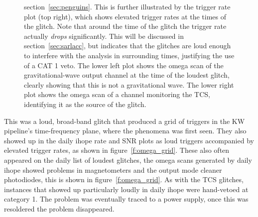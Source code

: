 \begin{figure}
{section~\ref{sec:penguins}.  This is further illustrated by the trigger
rate plot (top right), which shows elevated trigger rates at the times
of the glitch.  Note that around the time of the glitch the trigger
rate actually {\it drops} significantly.  This will be discussed in
section~\ref{sec:sarlacc}, but indicates that the glitches are loud
enough to interfere with the analysis in surrounding times, justifying
the use of a CAT 1 veto.  The lower left plot shows the omega scan
of the gravitational-wave output channel at the time of the loudest
glitch, clearly showing that this is not a gravitational wave.  The
lower right plot shows the omega scan of a channel monitoring the TCS,
identifying it as the source of the glitch.}
\end{figure}%



This was a loud, broad-band glitch that produced a grid of triggers in
the KW pipeline's time-frequency plane, where the phenomena was first
seen.  They also showed up in the daily ihope rate and SNR plots as
loud triggers accompanied by elevated trigger rates, as shown in
figure~\ref{f:omega_grid}.  These also often appeared on the
daily list of loudest glitches, the omega scans generated by daily
ihope showed problems in magnetometers and the output mode cleaner
photodiodes, this is shown in figure~\ref{f:omega_grid}.  As with the
TCS glitches, instances that showed up particularly loudly in daily
ihope were hand-vetoed at category 1.  The problem was eventually
traced to a power supply, once this was resoldered the problem
disappeared.



